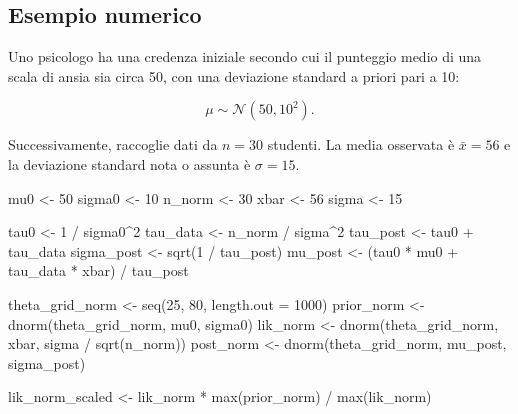 \documentclass[
  italian,
  letterpaper,
  a4paper,
  11pt,
  open=any]{scrbook}
\newenvironment{Shaded}{\begin{snugshade}}{\end{snugshade}}
\newcommand{\AttributeTok}[1]{\textcolor[rgb]{0.40,0.45,0.13}{#1}}
\newcommand{\DecValTok}[1]{\textcolor[rgb]{0.68,0.00,0.00}{#1}}
\newcommand{\FunctionTok}[1]{\textcolor[rgb]{0.28,0.35,0.67}{#1}}
\newcommand{\NormalTok}[1]{\textcolor[rgb]{0.00,0.23,0.31}{#1}}
\newcommand{\OtherTok}[1]{\textcolor[rgb]{0.00,0.23,0.31}{#1}}
\newcommand{\SpecialCharTok}[1]{\textcolor[rgb]{0.37,0.37,0.37}{#1}}
\theoremstyle{plain}
\theoremstyle{definition}
\theoremstyle{definition}
\theoremstyle{remark}
\begin{document}
\subsection{Esempio numerico}\label{esempio-numerico-2}

Uno psicologo ha una credenza iniziale secondo cui il punteggio medio di
una scala di ansia sia circa 50, con una deviazione standard a priori
pari a 10:

\[
\mu \sim \mathcal{N}(50, 10^2).
\]

Successivamente, raccoglie dati da \(n=30\) studenti. La media osservata
è \(\bar{x}=56\) e la deviazione standard nota o assunta è
\(\sigma=15\).

\begin{Shaded}
\begin{Highlighting}[]
\NormalTok{mu0 }\OtherTok{\textless{}{-}} \DecValTok{50}
\NormalTok{sigma0 }\OtherTok{\textless{}{-}} \DecValTok{10}
\NormalTok{n\_norm }\OtherTok{\textless{}{-}} \DecValTok{30}
\NormalTok{xbar }\OtherTok{\textless{}{-}} \DecValTok{56}
\NormalTok{sigma }\OtherTok{\textless{}{-}} \DecValTok{15}

\NormalTok{tau0 }\OtherTok{\textless{}{-}} \DecValTok{1} \SpecialCharTok{/}\NormalTok{ sigma0}\SpecialCharTok{\^{}}\DecValTok{2}
\NormalTok{tau\_data }\OtherTok{\textless{}{-}}\NormalTok{ n\_norm }\SpecialCharTok{/}\NormalTok{ sigma}\SpecialCharTok{\^{}}\DecValTok{2}
\NormalTok{tau\_post }\OtherTok{\textless{}{-}}\NormalTok{ tau0 }\SpecialCharTok{+}\NormalTok{ tau\_data}
\NormalTok{sigma\_post }\OtherTok{\textless{}{-}} \FunctionTok{sqrt}\NormalTok{(}\DecValTok{1} \SpecialCharTok{/}\NormalTok{ tau\_post)}
\NormalTok{mu\_post }\OtherTok{\textless{}{-}}\NormalTok{ (tau0 }\SpecialCharTok{*}\NormalTok{ mu0 }\SpecialCharTok{+}\NormalTok{ tau\_data }\SpecialCharTok{*}\NormalTok{ xbar) }\SpecialCharTok{/}\NormalTok{ tau\_post}

\NormalTok{theta\_grid\_norm }\OtherTok{\textless{}{-}} \FunctionTok{seq}\NormalTok{(}\DecValTok{25}\NormalTok{, }\DecValTok{80}\NormalTok{, }\AttributeTok{length.out =} \DecValTok{1000}\NormalTok{)}
\NormalTok{prior\_norm }\OtherTok{\textless{}{-}} \FunctionTok{dnorm}\NormalTok{(theta\_grid\_norm, mu0, sigma0)}
\NormalTok{lik\_norm }\OtherTok{\textless{}{-}} \FunctionTok{dnorm}\NormalTok{(theta\_grid\_norm, xbar, sigma }\SpecialCharTok{/} \FunctionTok{sqrt}\NormalTok{(n\_norm))}
\NormalTok{post\_norm }\OtherTok{\textless{}{-}} \FunctionTok{dnorm}\NormalTok{(theta\_grid\_norm, mu\_post, sigma\_post)}

\NormalTok{lik\_norm\_scaled }\OtherTok{\textless{}{-}}\NormalTok{ lik\_norm }\SpecialCharTok{*} \FunctionTok{max}\NormalTok{(prior\_norm) }\SpecialCharTok{/} \FunctionTok{max}\NormalTok{(lik\_norm)}


\end{Highlighting}
\end{Shaded}
\end{document}

